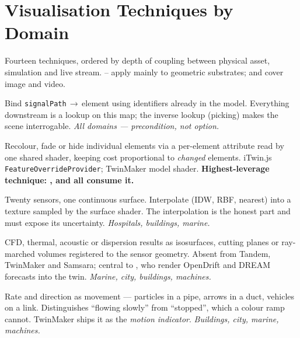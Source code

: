 \section{Visualisation Techniques by Domain}
\label{sec:techniques}

Fourteen techniques, ordered by depth of coupling between physical asset, simulation and
live stream. -- apply mainly to geometric substrates;  and
 cover image and video.

\begin{description}[leftmargin=1.55cm, style=nextline, itemsep=3pt, font=\bfseries\color{dtblue}]

\item[T1 Semantic anchoring] Bind \texttt{signalPath}\,$\rightarrow$\,element using
identifiers already in the model. Everything downstream is a lookup on this map; the
inverse lookup (picking) makes the scene interrogable. \emph{All domains ---
precondition, not option.}

\item[T2 Feature overrides] Recolour, fade or hide individual elements via a per-element
attribute read by one shared shader, keeping cost proportional to \emph{changed}
elements. iTwin.js \texttt{FeatureOverrideProvider}; TwinMaker model shader.
\textbf{Highest-leverage technique: ,  and  all consume it.}

\item[T3 Sparse-sensor field mapping] Twenty sensors, one continuous surface.
Interpolate (IDW, RBF, nearest) into a texture sampled by the surface shader. The
interpolation is the honest part and must expose its uncertainty. \emph{Hospitals,
buildings, marine.}

\item[T4 Volumetric simulation fields] CFD, thermal, acoustic or dispersion results as
isosurfaces, cutting planes or ray-marched volumes registered to the sensor geometry.
Absent from Tandem, TwinMaker and Samsara; central to
\citet{vasilijevic2024trondheim}, who render OpenDrift and DREAM forecasts into the
twin. \emph{Marine, city, buildings, machines.}

\item[T5 Flow advection] Rate and direction as movement --- particles in a pipe, arrows
in a duct, vehicles on a link. Distinguishes ``flowing slowly'' from ``stopped'', which
a colour ramp cannot. TwinMaker ships it as the \emph{motion indicator}. \emph{Buildings,
city, marine, machines.}


\end{description}
